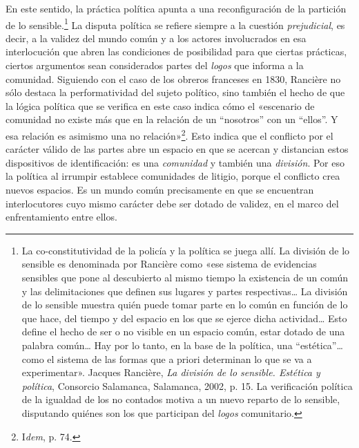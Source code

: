 En este sentido, la práctica política apunta a una reconfiguración de la partición de lo sensible.\footnote{La co-constitutividad de la policía y la política se juega allí. La división de lo sensible es denominada por Rancière como «ese sistema de evidencias sensibles que pone al descubierto al mismo tiempo la existencia de un común y las delimitaciones que definen sus lugares y partes respectivas\ldots{} La división de lo sensible muestra quién puede tomar parte en lo común en función de lo que hace, del tiempo y del espacio en los que se ejerce dicha actividad\ldots{} Esto define el hecho de ser o no visible en un espacio común, estar dotado de una palabra común\ldots{} Hay por lo tanto, en la base de la política, una ``estética''\ldots{} como el sistema de las formas que a priori determinan lo que se va a experimentar». Jacques Rancière, \emph{La división de lo sensible. Estética y política}, Consorcio Salamanca, Salamanca, 2002, p. 15. La verificación política de la igualdad de los no contados motiva a un nuevo reparto de lo sensible, disputando quiénes son los que participan del \emph{logos} comunitario.} La disputa política se refiere siempre a la cuestión \emph{prejudicial}, es decir, a la validez del mundo común y a los actores involucrados en esa interlocución que abren las condiciones de posibilidad para que ciertas prácticas, ciertos argumentos sean considerados partes del \emph{logos} que informa a la comunidad. Siguiendo con el caso de los obreros franceses en 1830, Rancière no sólo destaca la performatividad del sujeto político, sino también el hecho de que la lógica política que se verifica en este caso indica cómo el «escenario de comunidad no existe más que en la relación de un ``nosotros'' con un ``ellos''. Y esa relación es asimismo una no relación»\footnote{I\emph{dem}, p. 74.}. Esto indica que el conflicto por el carácter válido de las partes abre un espacio en que se acercan y distancian estos dispositivos de identificación: es una \emph{comunidad} y también una \emph{división}. Por eso la política al irrumpir establece comunidades de litigio, porque el conflicto crea nuevos espacios. Es un mundo común precisamente en que se encuentran interlocutores cuyo mismo carácter debe ser dotado de validez, en el marco del enfrentamiento entre ellos.

